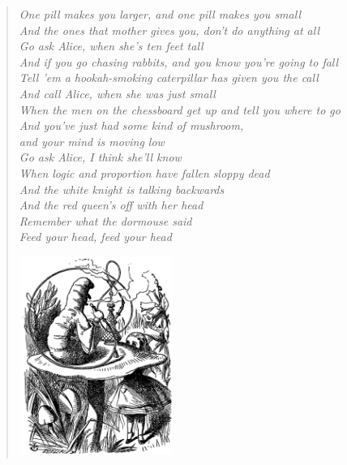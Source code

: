 \documentclass[b5paper, oneside, british, intoc, bibliograph=totoc, index=totoc, BCOR10mm, twoside, openright]{book}
\numberwithin{equation}{section}
\numberwithin{figure}{section}
\begin{document}
\begin{quotation}
\begin{flushright}
\textit{
One pill makes you larger, and one pill makes you small\\
And the ones that mother gives you, don't do anything at all\\
Go ask Alice, when she's ten feet tall\\[1PC]
And if you go chasing rabbits, and you know you're going to fall\\
Tell 'em a hookah-smoking caterpillar has given you the call\\
And call Alice, when she was just small\\[1PC]
When the men on the chessboard get up and tell you where to go\\
And you've just had some kind of mushroom, \\and your mind is moving low\\
Go ask Alice, I think she'll know\\[1PC]
When logic and proportion have fallen sloppy dead\\
And the white knight is talking backwards\\
And the red queen's off with her head\\
Remember what the dormouse said\\[1PC]
Feed your head, feed your head\\[3PC]
}



\includegraphics[width=5cm, keepaspectratio, right]{img/alice1.jpg}

\par\end{flushright}
\end{quotation}
\end{document}
